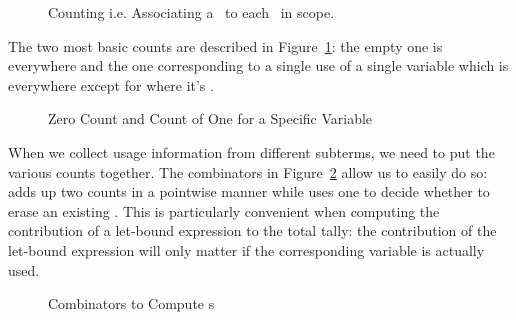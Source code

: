 \begin{figure}[h]
\begin{minipage}{0.45\textwidth}
\end{minipage}
\begin{minipage}{0.45\textwidth}
\end{minipage}
\caption{Counting i.e. Associating a ~to each ~in scope.}
\end{figure}

The two most basic counts are described in Figure~\ref{fig:basiccount}: the
empty one is  everywhere and the one corresponding to a single use
of a single variable  which is  everywhere except for 
where it's .

\begin{figure}[h]
\begin{minipage}{0.45\textwidth}
\end{minipage}
\begin{minipage}{0.45\textwidth}
\end{minipage}
\caption{Zero Count and Count of One for a Specific Variable}\label{fig:basiccount}
\end{figure}

When we collect usage information from different subterms, we need to put the
various counts together. The combinators in Figure~\ref{fig:combinatorscount}
allow us to easily do so:  adds up two counts in a pointwise manner
while  uses one  to decide whether to erase an existing
. This is particularly convenient when computing the contribution of
a let-bound expression to the total tally: the contribution of the let-bound
expression will only matter if the corresponding variable is actually used.

\begin{figure}[h]
\begin{minipage}{0.5\textwidth}
\end{minipage}
\begin{minipage}{0.4\textwidth}
\end{minipage}
\caption{Combinators to Compute s}\label{fig:combinatorscount}
\end{figure}

